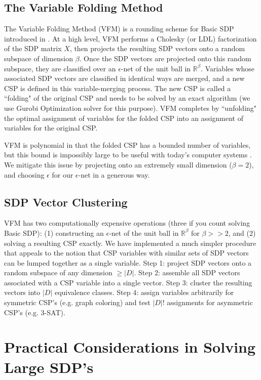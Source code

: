 \documentclass[11pt]{article} %
\begin{document}
\subsection{The Variable Folding Method}

The Variable Folding Method (VFM) is a rounding scheme for Basic SDP introduced in \citet{raghavendra2009round}. At a high level, VFM performs a Cholesky (or LDL) factorization of the SDP matrix $X$, then projects the resulting SDP vectors onto a random subspace of dimension $\beta$. Once the SDP vectors are projected onto this random subspace, they are classified over an $\epsilon$-net of the unit ball in $\mathbb{R}^\beta$. Variables whose associated SDP vectors are classified in identical ways are merged, and a new CSP is defined in this variable-merging process. The new CSP is called a ``folding" of the original CSP and needs to be solved by an exact algorithm (we use Gurobi Optimization solver for this purpose). VFM completes by ``unfolding" the optimal assignment of variables for the folded CSP into an assignment of variables for the original CSP.

VFM is polynomial in that the folded CSP has a bounded number of variables, but this bound is impossibly large to be useful with today's computer systems \citep{dwivedi2015introduction}. We mitigate this issue by projecting onto an extremely small dimension ($\beta = 2$), and choosing $\epsilon$ for our $\epsilon$-net in a generous way.

\subsection{SDP Vector Clustering}

VFM has two computationally expensive operations (three if you count solving Basic SDP): (1) constructing an $\epsilon$-net of the unit ball in $\mathbb{R}^\beta$ for $\beta>>2$, and (2) solving a resulting CSP exactly. We have implemented a much simpler procedure that appeals to the notion that CSP variables with similar sets of SDP vectors can be lumped together as a single variable. Step 1: project SDP vectors onto a random subspace of any dimension $\geq |D|$. Step 2: assemble all SDP vectors associated with a CSP variable into a single vector. Step 3: cluster the resulting vectors into $|D|$ equivalence classes. Step 4: assign variables arbitrarily for symmetric CSP's (e.g. graph coloring) and test $|D|!$ assignments for asymmetric CSP's (e.g. 3-SAT).


\section{Practical Considerations in Solving Large SDP's}
\end{document}
